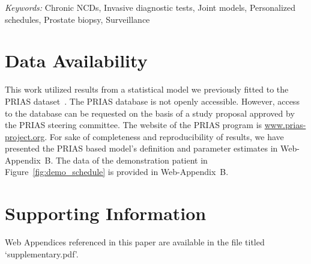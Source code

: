 \documentclass[12pt]{article}
\begin{document}
\bigskip


\noindent%
{\it Keywords:} Chronic NCDs, Invasive diagnostic tests, Joint models, Personalized schedules, Prostate biopsy, Surveillance
\vfill

\newpage
{} %









\section*{Data Availability}
This work utilized results from a statistical model we previously fitted to the PRIAS dataset~\citep{tomer2019personalized}. The PRIAS database is not openly accessible. However, access to the database can be requested on the basis of a study proposal approved by the PRIAS steering committee. The website of the PRIAS program is \url{www.prias-project.org}. For sake of completeness and reproducibility of results, we have presented the PRIAS based model's definition and parameter estimates in Web-Appendix~B. The data of the demonstration patient in Figure~\ref{fig:demo_schedule} is provided in Web-Appendix~B.

\section*{Supporting Information}
Web Appendices referenced in this paper are available in the file titled `supplementary.pdf'.




\end{document}
